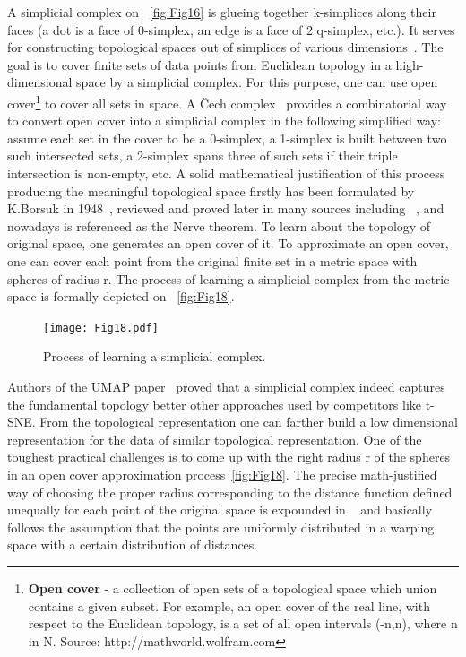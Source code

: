A simplicial complex on ~\autoref{fig:Fig16} is glueing together k-simplices along their faces (a dot is a face of 0-simplex, an edge is a face of 2 q-simplex, etc.). It serves for constructing topological spaces out of simplices of various dimensions~\cite{gamelin1999introduction}.
The goal is to cover finite sets of data points from Euclidean topology in a high-dimensional space by a simplicial complex. For this purpose, one can use open cover\footnote{\textbf{Open cover} - a collection of open sets of a topological space which union contains a given subset. For example, an open cover of the real line, with respect to the Euclidean topology, is a set of all open intervals (-n,n), where n in N. Source: http://mathworld.wolfram.com} to cover all sets in space. A Čech complex~\cite{MR1867354} provides a combinatorial way to convert open cover into a simplicial complex in the following simplified way: assume each set in the cover to be a 0-simplex, a 1-simplex is built between two such intersected sets, a 2-simplex spans three of such sets if their triple intersection is non-empty, etc. A solid mathematical justification of this process producing the meaningful topological space firstly has been formulated by K.Borsuk in 1948~\cite{Borsuk1948}, reviewed and proved later in many sources including ~\cite{MR1867354}, and nowadays is referenced as the Nerve theorem.
To learn about the topology of original space, one generates an open cover of it. To approximate an open cover, one can cover each point from the original finite set in a metric space with spheres of radius r. The process of learning a simplicial complex from the metric space is formally depicted on ~\autoref{fig:Fig18}.

\begin{figure}[!hp]
    \centering
    \texttt{[image: Fig18.pdf]}
    \caption{Process of learning a simplicial complex.}
    \label{fig:Fig18}
\end{figure}

Authors of the UMAP paper~\cite{mcinnes2018umap} proved that a simplicial complex indeed captures the fundamental topology better other approaches used by competitors like t-SNE. From the topological representation one can farther build a low dimensional representation for the data of similar topological representation. 
One of the toughest practical challenges is to come up with the right radius r of the spheres in an open cover approximation process~\autoref{fig:Fig18}. The precise math-justified way of choosing the proper radius corresponding to the distance function defined unequally for each point of the original space is expounded in ~\cite{mcinnes2018umap} and basically follows the assumption that the points are uniformly distributed in a warping space with a certain distribution of distances.

